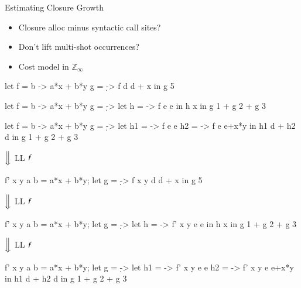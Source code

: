 \documentclass{haskellbeamer}
\newcommand{\id}[1]{\textsf{\textsl{#1}}\xspace}
\newcommand{\idf}{\id{f}}
\begin{document}
\begin{frame}[fragile]{Estimating Closure Growth}
  \begin{center}
    \begin{minipage}{0.45\textwidth}
      \begin{itemize}
        \item<3-> Closure alloc minus syntactic call sites? 
        \item<6-> Don't lift multi-shot occurrences? 
        \item<8-> Cost model in $\mathbb{Z}_\infty$ 
      \end{itemize}
    \end{minipage}%
    \begin{minipage}{0.55\textwidth}
      \begin{overprint}
        \begin{haskell}
          let f = \a b -> a*x + b*y
              g = \d -> f d d + x
          in g 5
        \end{haskell}
        \begin{haskell}
          let f = \a b -> a*x + b*y
              g = \d ->
                let h = \e -> f e e
                in h x
          in g 1 + g 2 + g 3
        \end{haskell}
        \begin{haskell}
          let f = \a b -> a*x + b*y
              g = \d ->
                let h1 = \e -> f e e
                    h2 = \e -> f e e+x*y
                in h1 d + h2 d
          in g 1 + g 2 + g 3
        \end{haskell}
      \end{overprint}
      \begin{overprint}
        \hspace{0.4\textwidth}$\Big\Downarrow$ LL $\idf$
        \begin{haskell}
          f' x y a b = a*x + b*y;
          let g = \d -> f x y d d + x
          in g 5
        \end{haskell}
        \hspace{0.4\textwidth}$\Big\Downarrow$ LL $\idf$
        \begin{haskell}
          f' x y a b = a*x + b*y;
          let g = \d ->
                let h = \e -> f' x y e e
                in h x
          in g 1 + g 2 + g 3
        \end{haskell}
        \hspace{0.4\textwidth}$\Big\Downarrow$ LL $\idf$
        \begin{haskell}
          f' x y a b = a*x + b*y;
          let g = \d ->
                let h1 = \e -> f' x y e e
                    h2 = \e -> f' x y e e+x*y
                in h1 d + h2 d
          in g 1 + g 2 + g 3
        \end{haskell}
      \end{overprint}
    \end{minipage}
  \end{center}
\end{frame}
\end{document}
